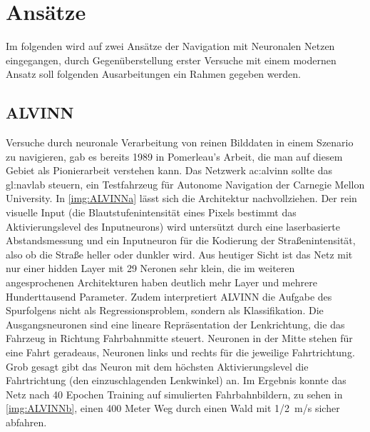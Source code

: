 \section{Ansätze}
Im folgenden wird auf zwei Ansätze der Navigation mit Neuronalen Netzen eingegangen, durch Gegenüberstellung erster Versuche mit einem modernen Ansatz soll folgenden Ausarbeitungen ein Rahmen gegeben werden.

\subsection{ALVINN}

Versuche durch neuronale Verarbeitung von reinen Bilddaten in einem Szenario zu navigieren, gab es bereits 1989 in Pomerleau's Arbeit, die man auf diesem Gebiet als Pionierarbeit verstehen kann\cite{pomerleau1989alvinn}.
Das Netzwerk \gls{ac:alvinn} sollte das \gls{gl:navlab} steuern, ein Testfahrzeug für Autonome Navigation der Carnegie Mellon University.
In \ref{img:ALVINNa} lässt sich die Architektur nachvollziehen. 
Der rein visuelle Input (die Blautstufenintensität eines Pixels bestimmt das Aktivierungslevel des Inputneurons) wird untersützt durch eine laserbasierte Abstandsmessung und ein Inputneuron für die Kodierung der \glqq Straßenintensität\grqq{}, also ob die Straße heller oder dunkler wird.
Aus heutiger Sicht ist das Netz mit nur einer hidden Layer mit 29 Neronen sehr klein, die im weiteren angesprochenen Architekturen haben deutlich mehr Layer und mehrere Hunderttausend Parameter. 
Zudem interpretiert ALVINN die Aufgabe des Spurfolgens nicht als Regressionsproblem, sondern als Klassifikation. Die Ausgangsneuronen sind eine lineare Repräsentation der Lenkrichtung, die das Fahrzeug in Richtung Fahrbahnmitte steuert. Neuronen in der Mitte stehen für eine Fahrt geradeaus, Neuronen links und rechts für die jeweilige Fahrtrichtung.
Grob gesagt gibt das Neuron mit dem höchsten Aktivierungslevel die Fahrtrichtung (den einzuschlagenden Lenkwinkel) an.
Im Ergebnis konnte das Netz nach 40 Epochen Training auf simulierten Fahrbahnbildern, zu sehen in \ref{img:ALVINNb}, einen 400 Meter Weg durch einen Wald mit \SI{1/2}{\meter/\second} sicher abfahren.


